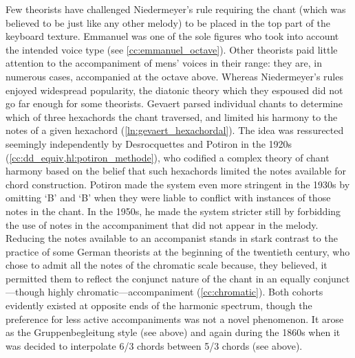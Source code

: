 Few theorists have challenged Niedermeyer's rule requiring the chant (which was believed to be just like any other melody) to be placed in the top part of the keyboard texture.
Emmanuel was one of the sole figures who took into account the intended voice type (see \cref{cc:emmanuel_octave}).
Other theorists paid little attention to the accompaniment of mens' voices in their range: they are, in numerous cases, accompanied at the octave above.
Whereas Niedermeyer's rules enjoyed widespread popularity, the diatonic theory which they espoused did not go far enough for some theorists.
Gevaert parsed individual chants to determine which of three hexachords the chant traversed, and limited his harmony to the notes of a given hexachord (\cref{ln:gevaert_hexachordal}).
The idea was ressurected seemingly independently by Desrocquettes and Potiron in the 1920s (\cref{cc:dd_equiv,hl:potiron_methode}), who codified a complex theory of chant harmony based on the belief that such hexachords limited the notes available for chord construction.
Potiron made the system even more stringent in the 1930s by omitting `B'\kern 1pt\flat{} and `B'\kern 1pt\natural{} when they were liable to conflict with instances of those notes in the chant.
In the 1950s, he made the system stricter still by forbidding the use of notes in the accompaniment that did not appear in the melody.
Reducing the notes available to an accompanist stands in stark contrast to the practice of some German theorists at the beginning of the twentieth century, who chose to admit all the notes of the chromatic scale because, they believed, it permitted them to reflect the conjunct nature of the chant in an equally conjunct---though highly chromatic---accompaniment (\cref{cc:chromatic}).
Both cohorts evidently existed at opposite ends of the harmonic spectrum, though the preference for less active accompaniments was not a novel phenomenon.
It arose as the Gruppenbegleitung style (see  above) and again during the 1860s when it was decided to interpolate 6/3 chords between 5/3 chords (see  above).

